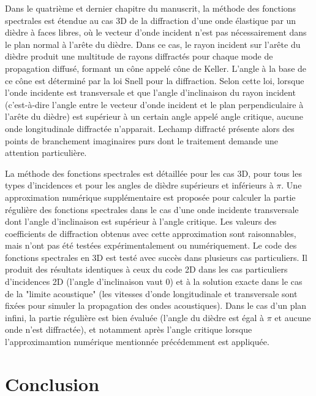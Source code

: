 Dans le quatrième et dernier chapitre du manuscrit, la méthode des fonctions spectrales est étendue au cas 3D de la diffraction d'une onde élastique par un dièdre à faces libres, où le vecteur d'onde incident n'est pas nécessairement dans le plan normal à l'arête du dièdre. Dans ce cas, le rayon incident sur l'arête du dièdre produit une multitude de rayons diffractés pour chaque mode de propagation diffusé, formant un cône appelé cône de Keller. L'angle à la base de ce cône est déterminé par la loi Snell pour la diffraction. Selon cette loi, lorsque l'onde incidente est transversale et que l'angle d'inclinaison du rayon incident (c'est-à-dire l'angle entre le vecteur d'onde incident et le plan perpendiculaire à l'arête du dièdre) est supérieur à un certain angle appelé angle critique, aucune onde longitudinale diffractée n'apparait. Lechamp diffracté présente alors des points de branchement imaginaires purs dont le traitement demande une attention particulière. 

La méthode des fonctions spectrales est détaillée pour les cas 3D, pour tous les types d'incidences et pour les angles de dièdre supérieurs et inférieurs à $\pi$. Une approximation numérique supplémentaire est proposée pour calculer la partie régulière des fonctions spectrales dans le cas d'une onde incidente transversale dont l'angle d'inclinaison est supérieur à l'angle critique. Les valeurs des coefficients de diffraction obtenus avec cette approximation sont raisonnables, mais n'ont pas été testées expérimentalement ou numériquement. Le code des fonctions spectrales en 3D est testé avec succès dans plusieurs cas particuliers. Il produit des résultats identiques à ceux du code 2D dans les cas particuliers d'incidences 2D (l'angle d'inclinaison vaut $0$) et à la solution exacte dans le cas de la "limite acoustique" (les vitesses d'onde longitudinale et transversale sont fixées pour simuler la propagation des ondes acoustiques). Dans le cas d'un plan infini, la partie régulière est bien évaluée (l'angle du dièdre est égal à $\pi$ et aucune onde n'est diffractée), et notamment après l'angle critique lorsque l'approximamtion numérique mentionnée précédemment est appliquée.

\section[Conclusion]{Conclusion}


